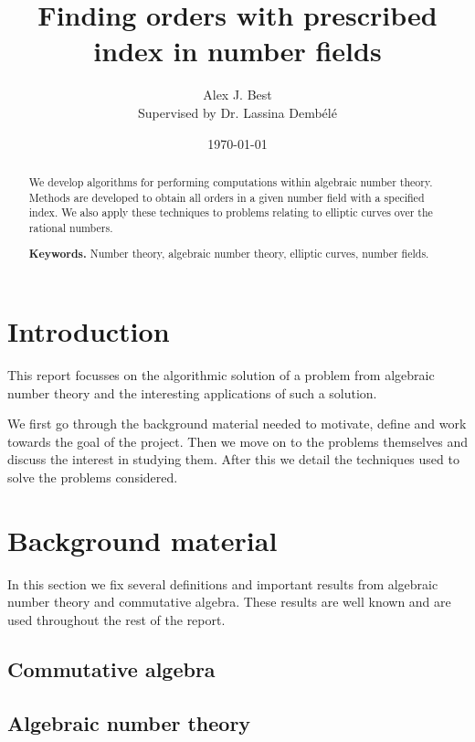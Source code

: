 \documentclass[a4paper,abstracton]{scrreprt}
\author{Alex J. Best \\Supervised by Dr. Lassina Demb\'el\'e}
\date{\today}
\title{Finding orders with prescribed index in number fields}
\theoremstyle{definition}
\begin{document}
\maketitle
\tableofcontents

\begin{abstract}
We develop algorithms for performing computations within algebraic number theory.
Methods are developed to obtain all orders in a given number field with a specified index.
We also apply these techniques to problems relating to elliptic curves over the rational numbers.

\smallskip
\noindent \textbf{Keywords.} Number theory, algebraic number theory, elliptic curves, number fields.
\end{abstract}

\chapter{Introduction}
This report focusses on the algorithmic solution of a problem from algebraic number theory and the interesting applications of such a solution.

We first go through the background material needed to motivate, define and work towards the goal of the project.
Then we move on to the problems themselves and discuss the interest in studying them.
After this we detail the techniques used to solve the problems considered.

\chapter{Background material}

In this section we fix several definitions and important results from algebraic number theory and commutative algebra.
These results are well known and are used throughout the rest of the report.

\section{Commutative algebra}


\section{Algebraic number theory}
\end{document}
